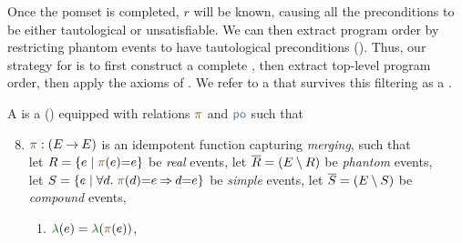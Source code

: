 Once the pomset is completed, $r$ will be known, causing all the
preconditions to be either tautological or unsatisfiable.  We can then
extract program order by restricting phantom events to have tautological
preconditions ().  Thus, our strategy for \cXI{} is to
first construct a complete \PwTpo{}, then extract top-level program order,
then apply the axioms of \rcXI{}.  We refer to a \PwTpo{} that survives this
filtering as a \PwTc{}.

\begin{definition}
  \label{def:po}
  A \PwTpo{} is a \PwT{} () equipped
  with relations $\rmrg$ and
  $\rpox$ such that 
  \begin{enumerate}[,label=(\textsc{m}\arabic*),ref=\textsc{m}\arabic*]
    \setcounter{enumi}{7}
  \item \label{pom-m} 
    $\fmrg{} : (\aEvs\fun\aEvs)$
    is an idempotent function capturing \emph{merging}, such that 
    \\
    let $\reEvs=\{\aEv\mid\fmrg{\aEv}\EQ\aEv\}$ be \emph{real} events,
    let $\overline{R}=(E\setminus R)$ be \emph{phantom} events,\\
    let $\umEvs=\{\aEv\mid\forall\bEv.\;\fmrg{\bEv}\EQ\aEv \limplies \bEv{=}\aEv\}$ be \emph{simple} events,
    let $\overline{S}=(E\setminus S)$ be \emph{compound} events,
    \begin{multicols}{2}
    \begin{enumerate}%
    \item \label{pom-m-lambda} 
      $\labeling(\aEv)=\labeling(\fmrg{\aEv})$,

\end{enumerate}
\end{multicols}
\end{enumerate}
\end{definition}
